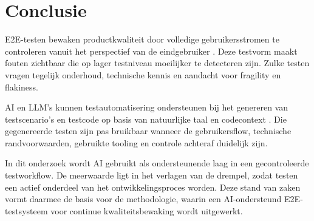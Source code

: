 \section{Conclusie}

E2E-testen bewaken productkwaliteit door volledige gebruikersstromen te controleren vanuit het perspectief van de eindgebruiker \autocite{DiMeglio2026}. Deze testvorm maakt fouten zichtbaar die op lager testniveau moeilijker te detecteren zijn. Zulke testen vragen tegelijk onderhoud, technische kennis en aandacht voor fragility en flakiness.

AI en LLM's kunnen testautomatisering ondersteunen bij het genereren van testscenario's en testcode op basis van natuurlijke taal en codecontext \autocite{Raju2025,SaezIznaga2025}. Die gegenereerde testen zijn pas bruikbaar wanneer de gebruikersflow, technische randvoorwaarden, gebruikte tooling en controle achteraf duidelijk zijn.

In dit onderzoek wordt AI gebruikt als ondersteunende laag in een gecontroleerde testworkflow. De meerwaarde ligt in het verlagen van de drempel, zodat testen een actief onderdeel van het ontwikkelingsproces worden. Deze stand van zaken vormt daarmee de basis voor de methodologie, waarin een AI-ondersteund E2E-testsysteem voor continue kwaliteitsbewaking wordt uitgewerkt.
